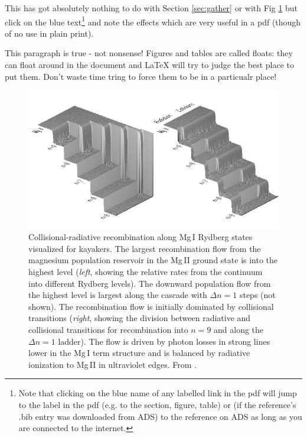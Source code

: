 \documentclass[twoside, fontsize=12pt,
     bibliography=totoc, %
     listof=totoc, %
     index=totoc, %
     onehalfspacing %
]{_MScDiss2017_cls}
\begin{document}
This has got absolutely nothing to do with Section \ref{sec:gather} or with Fig \ref{fig:waterfalls} but click on the blue text\footnote{Note that clicking on the blue name of any labelled link in the pdf will jump to the label in the pdf (e.g. to the section, figure, table) or (if the reference's .bib entry was downloaded from ADS) to the reference on ADS as long as you are connected to the internet.}
and note the effects which are very useful in a pdf (though of no use in plain print). 

This paragraph is true - not nonsense! Figures and tables are called floats: they can float around in the document and LaTeX will try to judge the best place to put them. Don't waste time tring to force them to be in a particualr place!

\begin{figure}[hbtp]
\begin{center}
  \includegraphics[width=155mm]{fig_waterfalls}  %
  \caption[ Collisional-radiative recombination along Mg\,I Rydberg states ]%
 { Collisional-radiative recombination along Mg\,I Rydberg states
    visualized for kayakers.  The largest recombination flow from the
    magnesium population reservoir in the Mg\,II ground state is into
    the highest level ({\em left\/}, showing the relative rates from
    the continuum into different Rydberg levels).  The downward
    population flow from the highest level is largest along the
    cascade with $\Delta n \!=\!1$ steps (not shown).  
    The recombination flow is initially dominated by collisional
    transitions ({\em right\/}, showing the division between radiative
    and collisional transitions for recombination into $n\!=\!9$ and
    along the $\Delta n \!=\!1$ ladder).  The flow is driven by photon
    losses in strong lines lower in the Mg\,I term structure and is
    balanced by radiative ionization to Mg\,II in ultraviolet edges.
    From . 
    } %
\label{fig:waterfalls}
\end{center}
\end{figure}   
\end{document}

